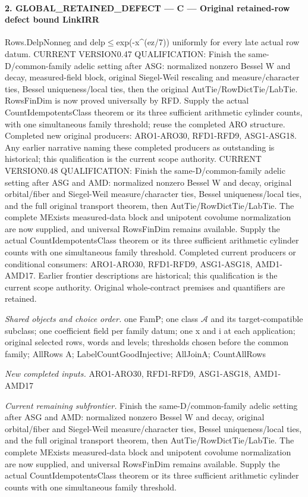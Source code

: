 \paragraph{2. GLOBAL\_\allowbreak RETAINED\_\allowbreak DEFECT — C — Original retained-row defect bound LinkIRR}

Rows.DelpNonneg and delp$\le$exp(-x\textasciicircum{}(ez/7)) uniformly for every late actual row datum. CURRENT VERSION0.47 QUALIFICATION: Finish the same-D/common-family adelic setting after ASG: normalized nonzero Bessel W and decay, measured-field block, original Siegel-Weil rescaling and measure/character ties, Bessel uniqueness/local ties, then the original AutTie/RowDictTie/LabTie. RowsFinDim is now proved universally by RFD. Supply the actual CountIdempotentsClass theorem or its three sufficient arithmetic cylinder counts, with one simultaneous family threshold; reuse the completed ARO structure. Completed new original producers: ARO1-ARO30, RFD1-RFD9, ASG1-ASG18. Any earlier narrative naming these completed producers as outstanding is historical; this qualification is the current scope authority. CURRENT VERSION0.48 QUALIFICATION: Finish the same-D/common-family adelic setting after ASG and AMD: normalized nonzero Bessel W and decay, original orbital/fiber and Siegel-Weil measure/character ties, Bessel uniqueness/local ties, and the full original transport theorem, then AutTie/RowDictTie/LabTie. The complete MExists measured-data block and unipotent covolume normalization are now supplied, and universal RowsFinDim remains available. Supply the actual CountIdempotentsClass theorem or its three sufficient arithmetic cylinder counts with one simultaneous family threshold. Completed current producers or conditional consumers: ARO1-ARO30, RFD1-RFD9, ASG1-ASG18, AMD1-AMD17. Earlier frontier descriptions are historical; this qualification is the current scope authority. Original whole-contract premises and quantifiers are retained.

\emph{Shared objects and choice order.} one FamP; one class $\mathcal A$ and its target-compatible subclass; one coefficient field per family datum; one x and i at each application; original selected rows, words and levels; thresholds chosen before the common family; AllRows A; LabelCountGoodInjective; AllJoinA; CountAllRows

\emph{New completed inputs.} ARO1-ARO30, RFD1-RFD9, ASG1-ASG18, AMD1-AMD17

\emph{Current remaining subfrontier.} Finish the same-D/common-family adelic setting after ASG and AMD: normalized nonzero Bessel W and decay, original orbital/fiber and Siegel-Weil measure/character ties, Bessel uniqueness/local ties, and the full original transport theorem, then AutTie/RowDictTie/LabTie. The complete MExists measured-data block and unipotent covolume normalization are now supplied, and universal RowsFinDim remains available. Supply the actual CountIdempotentsClass theorem or its three sufficient arithmetic cylinder counts with one simultaneous family threshold.

